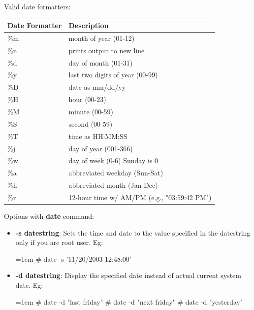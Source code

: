 \begin{flushleft}
\begin{enumerate}
\begin{enumerate}[label=(\alph*)]
			Valid date formatters:
			\newline
			\newline
			\begin{tabulary}{1.0\textwidth}{|p{8em}|p{16em}|}
				\toprule
				\textbf{Date Formatter} & \textbf{Description}\\
				\midrule
				\%m & month of year (01-12) \\
				\hline
				\%n & prints output to new line \\
				\hline
				\%d & day of month (01-31) \\
				\hline
				\%y & last two digits of year (00-99) \\
				\hline
				\%D & date as mm/dd/yy \\
				\hline
				\%H & hour (00-23) \\
				\hline
				\%M & minute (00-59) \\
				\hline
				\%S & second (00-59) \\
				\hline
				\%T & time as HH:MM:SS \\
				\hline
				\%j & day of year (001-366) \\
				\hline
				\%w & day of week (0-6) Sunday is 0 \\
				\hline
				\%a & abbreviated weekday (Sun-Sat) \\
				\hline
				\%h & abbreviated month (Jan-Dec) \\
				\hline
				\%r & 12-hour time w/ AM/PM (e.g., "03:59:42 PM")\\
				\bottomrule
			\end{tabulary}
		
			Options with \textbf{date} command:
			
			\begin{itemize}
				\item \textbf{-s datestring}: Sets the time and date to the value specified in the datestring only if you are root user.
				\newline
				Eg:
				\bigskip
				\begin{tcolorbox}[breakable,notitle,boxrule=-0pt,colback=black,colframe=black]
					\color{green}
					\font=1em
					\# date -s '11/20/2003 12:48:00'
					\font=4pt
				\end{tcolorbox}
				\item \textbf{-d datestring}: Display the specified date instead of actual current system date.
				\newline
				Eg:
				\bigskip
				\begin{tcolorbox}[breakable,notitle,boxrule=-0pt,colback=black,colframe=black]
					\color{green}
					\fontdimen2\font=1em
					\# date -d "last friday"
					\newline
					\# date -d "next friday"
					\newline
					\# date -d "yesterday"
					\fontdimen2\font=4pt
				\end{tcolorbox}
			\end{itemize}
			

\end{enumerate}
\end{enumerate}
\end{flushleft}
